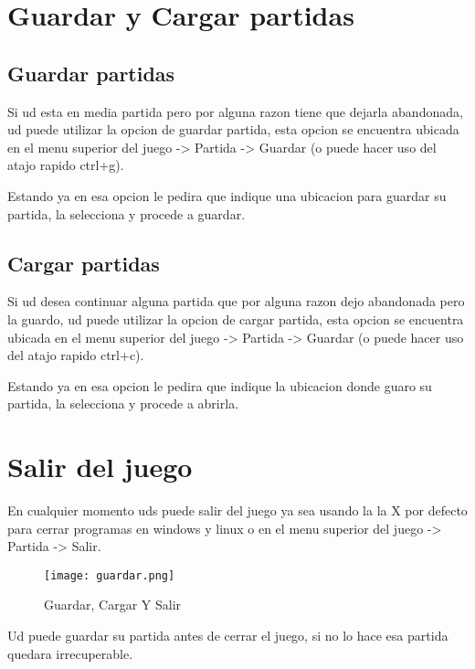 \documentclass[11pt,fleqn]{book} %
\begin{document}
\section{Guardar y Cargar partidas}

\subsection{Guardar partidas}

Si ud esta en media partida pero por alguna razon tiene que dejarla abandonada, ud puede utilizar la opcion de guardar partida, esta opcion se encuentra ubicada en el menu superior del juego -> Partida -> Guardar (o puede hacer uso del atajo rapido ctrl+g).



Estando ya en esa opcion le pedira que indique una ubicacion para guardar su partida, la selecciona y procede a guardar.

\subsection{Cargar partidas}

Si ud desea continuar alguna partida que por alguna razon dejo abandonada pero la guardo, ud puede utilizar la opcion de cargar partida, esta opcion se encuentra ubicada en el menu superior del juego -> Partida -> Guardar (o puede hacer uso del atajo rapido ctrl+c).



Estando ya en esa opcion le pedira que indique la ubicacion donde guaro su partida, la selecciona y procede a abrirla.

\section{Salir del juego}

En cualquier momento uds puede salir del juego ya sea usando la la X por defecto para cerrar programas en windows y linux o en el menu superior del juego -> Partida -> Salir.

\begin{figure}[H]
\centering\texttt{[image: guardar.png]}
\caption{Guardar, Cargar Y Salir}
\end{figure}

Ud puede guardar su partida antes de cerrar el juego, si no lo hace esa partida quedara irrecuperable.
\end{document}
